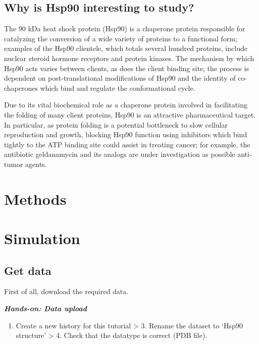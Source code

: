 \documentclass[twocolumn]{bmcart}%
\providecommand{\tightlist}{%
  \setlength{\itemsep}{0pt}\setlength{\parskip}{0pt}}
\begin{document}
\hypertarget{why-is-hsp90-interesting-to-study}{%
\subsection*{Why is Hsp90 interesting to
study?}\label{why-is-hsp90-interesting-to-study}}

The 90 kDa heat shock protein (Hsp90) is a chaperone protein responsible
for catalyzing the conversion of a wide variety of proteins to a
functional form; examples of the Hsp90 clientele, which totals several
hundred proteins, include nuclear steroid hormone receptors and protein
kinases. The mechanism by which Hsp90 acts varies between clients, as
does the client binding site; the process is dependent on
post-translational modifications of Hsp90 and the identity of
co-chaperones which bind and regulate the conformational cycle.

Due to its vital biochemical role as a chaperone protein involved in
facilitating the folding of many client proteins, Hsp90 is an attractive
pharmaceutical target. In particular, as protein folding is a potential
bottleneck to slow cellular reproduction and growth, blocking Hsp90
function using inhibitors which bind tightly to the ATP binding site
could assist in treating cancer; for example, the antibiotic
geldanamycin and its analogs are under investigation as possible
anti-tumor agents.



\hypertarget{methods}{%
\section*{Methods}\label{simulation}}
\hypertarget{simulation}{%
\section*{Simulation}\label{simulation}}

\hypertarget{get-data}{%
\subsection{Get data}\label{get-data}}

First of all, download the required data.

\textbf{\emph{Hands-on: Data upload}}

\begin{enumerate}
\def\labelenumi{\arabic{enumi}.}
\tightlist
\item
  Create a new history for this tutorial \textgreater{} 3. Rename the
  dataset to `Hsp90 structure' \textgreater{} 4. Check that the datatype
  is correct (PDB file). 
\end{enumerate}
\end{document}
